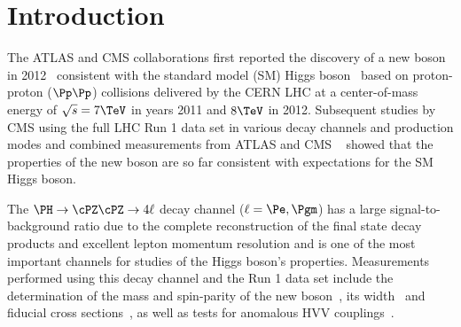 \section{Introduction}
\label{sec:intro}

The ATLAS and CMS collaborations first reported the discovery of a new boson in 2012~\cite{Chatrchyan:2012ufa,Aad:2012tfa}
consistent with the standard model (SM) Higgs 
boson~\cite{Englert:1964et,Higgs:1964ia,Higgs:1964pj,Guralnik:1964eu,Higgs:1966ev,Kibble:1967sv} 
based on proton-proton ($\Pp\Pp$) collisions delivered by the CERN LHC at a center-of-mass energy of 
$\sqrt{s}=7\TeV$ in years 2011 and $8\TeV$ in 2012. 
Subsequent studies by CMS using the full LHC Run 1 data set in various decay channels and production modes 
and combined measurements from ATLAS and CMS ~\cite{CMS:2014ega, AtlasProperties, Aad:2015zhl, CMS:2015kwa}
showed that the properties of the new boson are so far consistent with expectations for the SM Higgs boson.

The $\HZZfl$ decay channel ($\ell=\Pe,\Pgm$) has a large signal-to-background ratio due to the 
complete reconstruction of the final state decay products and excellent lepton momentum resolution
and is one of the most important channels for studies of the Higgs boson's properties. 
Measurements performed using this decay channel and the Run 1 data set include the determination of 
the mass and spin-parity of the new boson~\cite{CMSH4lLegacy,CMSH4lSpinParity,CMSH4lAnomalousCouplings}, 
its width~\cite{CMSH4lWidth,CMSH4lLifetime} and fiducial cross sections~\cite{CMSH4lFiducial8TeV}, as well as 
tests for anomalous HVV couplings~\cite{CMSH4lAnomalousCouplings,CMSH4lLifetime}. 

